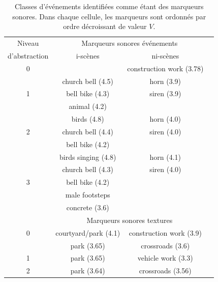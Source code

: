  
\begin{table}[t]
 \setlength{\tabcolsep}{0.2pt}
 \centering
  {\renewcommand{\arraystretch}{0.9}
\begin{tabular}{c c c c} 
Niveau        & \multicolumn{2}{c}{Marqueurs sonores événements} \\
d'abstraction & i-scènes & ni-scènes \\
\hline
0  &                               &  construction work (3.78)  \\
\hline
  & church bell  (4.5)             & horn  (3.9) \\
1 & bell bike    (4.3)             & siren (3.9)\\
  & animal       (4.2)             &       \\
   \hline
  & birds        (4.8)             & horn  (4.0)\\
2 & church bell  (4.4)             & siren (4.0)\\
  & bell bike    (4.2)             &       \\
   \hline
  & birds singing (4.8)            & horn  (4.1)\\
  & church bell   (4.3)            & siren (4.0)\\
3 & bell bike     (4.2)            &       \\
  & male footsteps                 &  \\
  &   concrete (3.6)               &  \\
  \hline
  \hline
          & \multicolumn{2}{c}{Marqueurs sonores textures}      \\
\hline
0         &     courtyard/park (4.1) &  construction work (3.9)  \\
\hline
          &     park (3.65)           &  crossroads (3.6)  \\
1         &     park (3.65)           &  vehicle work (3.3)  \\
\hline
2         &     park (3.64)           &  crossroads (3.56)  \\
\end{tabular}
}
\vspace{0.5mm}
\caption[Classes d'événements identifiées comme étant des marqueurs sonores]{Classes d'événements identifiées comme étant des marqueurs sonores. Dans chaque cellule, les marqueurs sont ordonnés par ordre décroissant de valeur $V$.}
\label{tab:markers}
\end{table}

